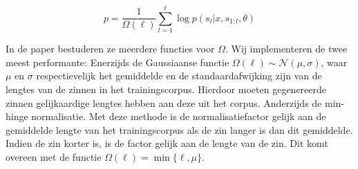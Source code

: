 \begin{equation}
p = \frac{1}{\Omega(\ell)}\sum_{l=1}^{\ell} \log p(s_l | x, s_{1:l}, \theta)
\label{eq:log-sentence-norm}
\end{equation}

In de paper bestuderen ze meerdere functies voor $\Omega$. Wij implementeren de twee meest performante:
Enerzijds de Gaussiaanse functie $\Omega(\ell) \sim \mathcal{N}(\mu, \sigma)$, waar $\mu$ en $\sigma$ respectievelijk het gemiddelde en de standaardafwijking zijn van de lengtes van de zinnen in het trainingscorpus. Hierdoor moeten gegenereerde zinnen gelijkaardige lengtes hebben aan deze uit het corpus. 
Anderzijds de min-hinge normalisatie. Met deze methode is de normalisatiefactor gelijk aan de gemiddelde lengte van het trainingscorpus als de zin langer is dan dit gemiddelde. Indien de zin korter is, is de factor gelijk aan de lengte van de zin. Dit komt overeen met de functie $\Omega(\ell)=\min\{\ell, \mu\}$. 
